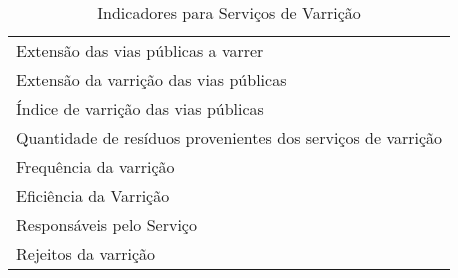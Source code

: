 \begin{table}[h!]
  \centering
  \caption{Indicadores para Serviços de Varrição}
\begin{tabular}{|p{28.855em}|}
	\rowcolor[rgb]{ .984,  .831,  .706} \multicolumn{1}{p{28.855em}}{SERVIÇOS DE VARRIÇÃO} \\
	\midrule
	Extensão das vias públicas a varrer \\
	\midrule
	Extensão da varrição das vias públicas \\
	\midrule
	Índice de varrição das vias públicas \\
	\midrule
	Quantidade de resíduos provenientes dos serviços de varrição \\
	\midrule
	Frequência da varrição \\
	\midrule
	Eficiência da Varrição \\
	\midrule
	Responsáveis pelo Serviço \\
	\midrule
	Rejeitos da varrição  \\
	\bottomrule
\end{tabular}%

  \label{tab:addlabel}%
\end{table}%
